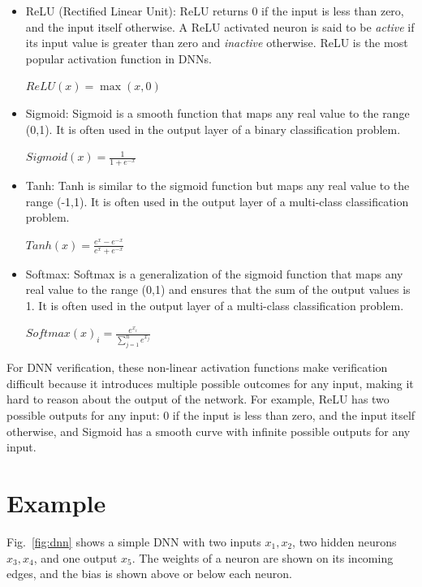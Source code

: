 \begin{itemize}
\item ReLU (Rectified Linear Unit):  ReLU returns 0 if the input is less than zero, and the input itself otherwise. 
A ReLU activated neuron is said to be \emph{active} if its input value is greater than zero and \emph{inactive} otherwise.
ReLU is the most popular activation function in DNNs.\\
    \begin{center}
        $ReLU(x) = \max(x,0)$
    \end{center}


    
    
\item Sigmoid: Sigmoid is a smooth function that maps any real value to the range (0,1). It is often used in the output layer of a binary classification problem.\\
    \begin{center}
        $Sigmoid(x) = \frac{1}{1+e^{-x}}$
    \end{center}
\item Tanh: Tanh is similar to the sigmoid function but maps any real value to the range (-1,1). It is often used in the output layer of a multi-class classification problem.\\
    \begin{center}
        $Tanh(x) = \frac{e^x-e^{-x}}{e^x+e^{-x}}$
    \end{center}
\item Softmax: Softmax is a generalization of the sigmoid function that maps any real value to the range (0,1) and ensures that the sum of the output values is 1. It is often used in the output layer of a multi-class classification problem.\\
    \begin{center}
    $Softmax(x)_i = \frac{e^{x_i}}{\sum_{j=1}^{n}e^{x_j}}$
    \end{center}
\end{itemize}

For DNN verification, these non-linear activation functions make verification difficult because it introduces multiple possible outcomes for any input, making it hard to reason about the output of the network. For example, ReLU has two possible outputs for any input: 0 if the input is less than zero, and the input itself otherwise, and Sigmoid has a smooth curve with infinite possible outputs for any input.


\section{Example} 
Fig.~\ref{fig:dnn} shows a simple DNN with two inputs $x_1,x_2$, two hidden neurons $x_3,x_4$, and one output $x_5$. The weights of a neuron are shown on its incoming edges, and the bias is shown above or below each neuron. 

